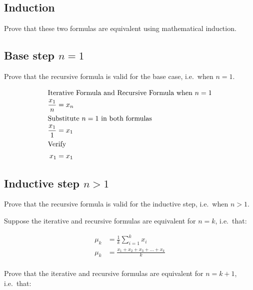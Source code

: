 \documentclass[24pt]{article}
\begin{document}
    \subsection{Induction}\label{subsec:induction}
    Prove that these two formulas are equivalent using mathematical induction.

    \subsection{Base step $n = 1$}\label{subsec:base-step}
    Prove that the recursive formula is valid for the base case, i.e.~when $n = 1$.

    \begin{align}
        \intertext{Iterative Formula and Recursive Formula when $n = 1$}
        \frac{x_1}{n} &= x_n \\
        \intertext{Substitute $n = 1$ in both formulas}
        \frac{x_1}{1} &= x_1 \\
        \intertext{Verify}
        x_1 &= x_1
    \end{align}

    \subsection{Inductive step $n > 1$}\label{subsec:inductive-step}
    Prove that the recursive formula is valid for the inductive step, i.e.~when $n > 1$.

    Suppose the iterative and recursive formulas are equivalent for $n = k$, i.e.~that:

    \begin{align}
        \mu_{k} &= \frac{1}{k} \sum_{i=1}^{k} x_i \\
        \mu_{k} &= \frac{x_1 + x_2 + x_3 + \dots + x_k}{k} \\
    \end{align}

    Prove that the iterative and recursive formulas are equivalent for $n = k + 1$, i.e.~that:
\end{document}
